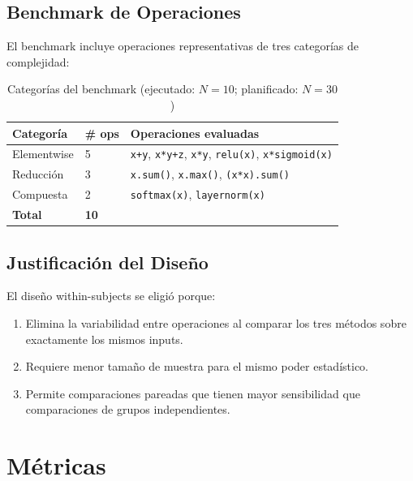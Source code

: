 \documentclass[12pt]{article}
\begin{document}
\subsection{Benchmark de Operaciones}

El benchmark incluye operaciones representativas de tres categorías de complejidad:

\begin{table}[H]
\centering
\caption{Categorías del benchmark (ejecutado: $N=10$; planificado: $N=30$)}
\begin{tabular}{llp{7cm}}
\toprule
\textbf{Categoría} & \textbf{\# ops} & \textbf{Operaciones evaluadas} \\
\midrule
Elementwise & 5 & \texttt{x+y}, \texttt{x*y+z}, \texttt{x*y}, \texttt{relu(x)}, \texttt{x*sigmoid(x)} \\
Reducción   & 3 & \texttt{x.sum()}, \texttt{x.max()}, \texttt{(x*x).sum()} \\
Compuesta   & 2 & \texttt{softmax(x)}, \texttt{layernorm(x)} \\
\midrule
\textbf{Total} & \textbf{10} & \\
\bottomrule
\end{tabular}
\end{table}

\subsection{Justificación del Diseño}

El diseño within-subjects se eligió porque:
\begin{enumerate}
  \item Elimina la variabilidad entre operaciones al comparar los tres métodos sobre
    exactamente los mismos inputs.
  \item Requiere menor tamaño de muestra para el mismo poder estadístico.
  \item Permite comparaciones pareadas que tienen mayor sensibilidad que comparaciones
    de grupos independientes.
\end{enumerate}

\section{Métricas}
\end{document}
